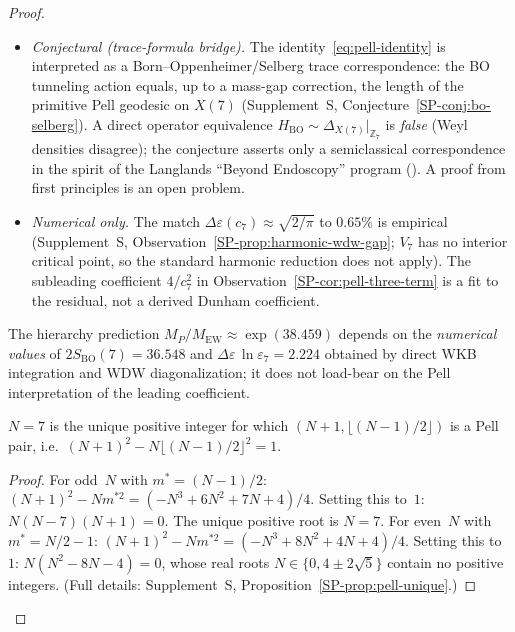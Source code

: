 \begin{proof}
\begin{itemize}
  is exactly~$7$ (unipotent conjugacy class), and the
  hyperbolic translation length of $\gamma$ is
  $2\ln\varepsilon_7$, so the primitive geodesic on $X(7)$ has
  length $14\ln\varepsilon_7$
  (Supplement~S, Lemma~\ref*{SP-lem:pell-geodesic}).
  \emph{Therefore the integer $14$ is arithmetic, not fitted.}
\item \emph{Conjectural (trace-formula bridge).}
  The identity~\eqref{eq:pell-identity} is interpreted as a
  Born--Oppenheimer/Selberg trace correspondence: the BO
  tunneling action equals, up to a mass-gap correction, the
  length of the primitive Pell geodesic on $X(7)$
  (Supplement~S, Conjecture~\ref*{SP-conj:bo-selberg}).
  A direct operator equivalence
  $H_{\mathrm{BO}} \sim \Delta_{X(7)}|_{\mathbb{Z}_7}$ is
  \emph{false} (Weyl densities disagree); the conjecture
  asserts only a semiclassical correspondence in the spirit
  of the Langlands ``Beyond Endoscopy'' program
  (\citealt{Langlands2004,FrenkelLanglandsNgo2010}).  A proof
  from first principles is an open problem.
\item \emph{Numerical only.}
  The match $\Delta\varepsilon(c_7) \approx \sqrt{2/\pi}$ to
  $0.65\%$ is empirical (Supplement~S,
  Observation~\ref*{SP-prop:harmonic-wdw-gap}; $V_7$ has no
  interior critical point, so the standard harmonic reduction
  does not apply).  The subleading coefficient
  $4/c_7^2$ in Observation~\ref*{SP-cor:pell-three-term} is a fit
  to the residual, not a derived Dunham coefficient.
\end{itemize}
The hierarchy prediction $M_P/M_{\mathrm{EW}} \approx
\exp(38.459)$ depends on the \emph{numerical values} of
$2S_{\mathrm{BO}}(7) = 36.548$ and
$\Delta\varepsilon\,\ln\varepsilon_7 = 2.224$ obtained by
direct WKB integration and WDW diagonalization; it does
not load-bear on the Pell interpretation of the leading
coefficient.

\begin{proposition}[Pell uniqueness at $N = 7$]
\label{prop:pell-unique}
$N = 7$ is the unique positive integer for which
$(N{+}1, \lfloor(N{-}1)/2\rfloor)$ is a Pell pair,
i.e.\ $(N{+}1)^2 - N \lfloor(N{-}1)/2\rfloor^2 = 1$.
\end{proposition}
\begin{proof}
For odd~$N$ with $m^* = (N{-}1)/2$:
$(N{+}1)^2 - N m^{*2}
= (-N^3{+}6N^2{+}7N{+}4)/4$.
Setting this to~$1$: $N(N{-}7)(N{+}1) = 0$.
The unique positive root is $N = 7$.
For even~$N$ with $m^* = N/2 - 1$:
$(N{+}1)^2 - N m^{*2} = (-N^3 + 8N^2 + 4N + 4)/4$.
Setting this to~$1$: $N(N^2 - 8N - 4) = 0$, whose real roots
$N \in \{0, 4 \pm 2\sqrt{5}\}$ contain no positive integers.
(Full details: Supplement~S,
Proposition~\ref*{SP-prop:pell-unique}.)
\end{proof}


\end{proof}
